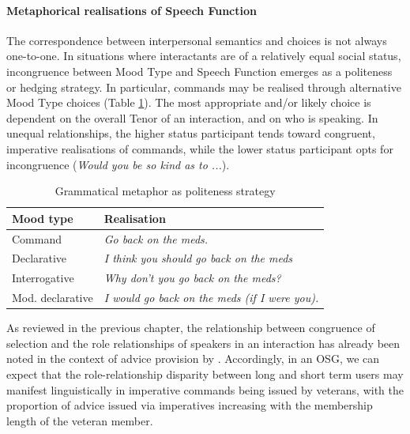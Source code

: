 

\paragraph{Metaphorical realisations of Speech Function}

The correspondence between interpersonal semantics and  choices is not always one\hyp{}to\hyp{}one. In situations where interactants are of a relatively equal social status, incongruence between Mood Type and Speech Function emerges as a politeness or hedging strategy. In particular, commands may be realised through alternative Mood Type choices (Table \ref{tab:gram_met_mood}). The most appropriate and\slash or likely choice is dependent on the overall Tenor of an interaction, and on who is speaking. In unequal relationships, the higher status participant tends toward congruent, imperative realisations of commands, while the lower status participant opts for incongruence (\emph{Would you be so kind as to ...}).

\begin{table}[htb]
    \begin{tabular}{ll}
    \toprule
    Mood type & Realisation \\
     \midrule
    Command & \emph{Go back on the meds.} \\
    Declarative & \emph{I think you should go back on the meds} \\
    Interrogative &  \emph{Why don't you go back on the meds?} \\
    Mod. declarative & \emph{I would go back on the meds (if I were you).} \\
    \bottomrule
    \end{tabular}
\caption{Grammatical metaphor as politeness strategy}
\label{tab:gram_met_mood}
\end{table}
%
As reviewed in the previous chapter, the relationship between congruence of  selection and the role relationships of speakers in an interaction has already been noted in the context of advice provision by \textcite[see Section \ref{sect:advice}]{decapua_`if_1995}. Accordingly, in an \gls{OSG}, we can expect that the role-relationship disparity between long and short term users may manifest linguistically in imperative commands being issued by veterans, with the proportion of advice issued via imperatives increasing with the membership length of the veteran member.

